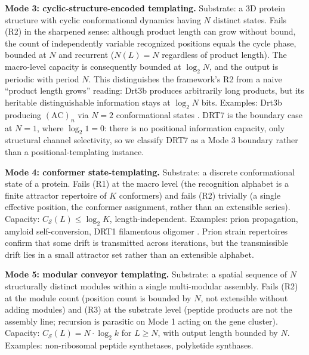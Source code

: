 \documentclass[aps,prx,reprint,amsmath,amssymb,floatfix,superscriptaddress,nofootinbib]{revtex4-2}
\theoremstyle{plain-thm}
\theoremstyle{definition-thm}
\newcommand{\Csub}{C_{\mathcal{S}}}
\begin{document}
\textbf{Mode 3: cyclic-structure-encoded templating.} Substrate: a 3D protein structure with cyclic conformational dynamics having $N$ distinct states. Fails (R2) in the sharpened sense: although product length can grow without bound, the count of independently variable recognized positions equals the cycle phase, bounded at $N$ and recurrent ($N(L) = N$ regardless of product length). The macro-level capacity is consequently bounded at $\log_2 N$, and the output is periodic with period $N$. This distinguishes the framework's R2 from a naive ``product length grows'' reading: Drt3b produces arbitrarily long products, but its heritable distinguishable information stays at $\log_2 N$ bits. Examples: Drt3b producing $(\mathrm{AC})_n$ via $N=2$ conformational states \citep{Deng2026}. DRT7 is the boundary case at $N=1$, where $\log_2 1 = 0$: there is no positional information capacity, only structural channel selectivity, so we classify DRT7 as a Mode 3 boundary rather than a positional-templating instance.

\textbf{Mode 4: conformer state-templating.} Substrate: a discrete conformational state of a protein. Fails (R1) at the macro level (the recognition alphabet is a finite attractor repertoire of $K$ conformers) and fails (R2) trivially (a single effective position, the conformer assignment, rather than an extensible series). Capacity: $\Csub(L) \le \log_2 K$, length-independent. Examples: prion propagation, amyloid self-conversion, DRT1 filamentous oligomer \citep{DRT1preprint2026}. Prion strain repertoires confirm that some drift is transmitted across iterations, but the transmissible drift lies in a small attractor set rather than an extensible alphabet.

\textbf{Mode 5: modular conveyor templating.} Substrate: a spatial sequence of $N$ structurally distinct modules within a single multi-modular assembly. Fails (R2) at the module count (position count is bounded by $N$, not extensible without adding modules) and (R3) at the substrate level (peptide products are not the assembly line; recursion is parasitic on Mode 1 acting on the gene cluster). Capacity: $\Csub(L) = N \cdot \log_2 k$ for $L \ge N$, with output length bounded by $N$. Examples: non-ribosomal peptide synthetases, polyketide synthases.
\end{document}
